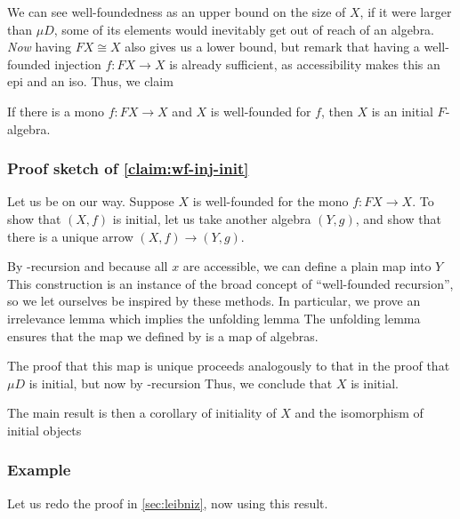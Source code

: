 We can see well-foundedness as an upper bound on the size of $X$, if it were larger than $\mu D$, some of its elements would inevitably get out of reach of an algebra. \textit{Now} having $FX \cong X$ also gives us a lower bound, but remark that having a well-founded injection $f: FX \to X$ is already sufficient, as accessibility makes this an epi and an iso.  Thus, we claim
\begin{claim}\label{claim:wf-inj-init}
    If there is a mono $f : FX \to X$ and $X$ is well-founded for $f$, then $X$ is an initial $F$-algebra.
\end{claim}

\subsubsection{Proof sketch of \autoref{claim:wf-inj-init}}
Let us be on our way. Suppose $X$ is well-founded for the mono $f : FX \to X$. To show that $(X, f)$ is initial, let us take another algebra $(Y, g)$, and show that there is a unique arrow $(X, f) \to (Y, g)$.

By -recursion and because all $x$ are accessible, we can define a plain map into $Y$
This construction is an instance of the broad concept of ``well-founded recursion'', so we let ourselves be inspired by these methods. In particular, we prove an irrelevance lemma
which implies the unfolding lemma
The unfolding lemma ensures that the map we defined by  is a map of algebras.

The proof that this map is unique proceeds analogously to that in the proof that $\mu D$ is initial, but now by -recursion
Thus, we conclude that $X$ is initial.

The main result is then a corollary of initiality of $X$ and the isomorphism of initial objects


\subsubsection{Example}
Let us redo the proof in \autoref{sec:leibniz}, now using this result. 